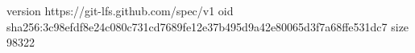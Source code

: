 version https://git-lfs.github.com/spec/v1
oid sha256:3c98efdf8e24c080c731cd7689fe12e37b495d9a42e80065d3f7a68ffe531dc7
size 98322
